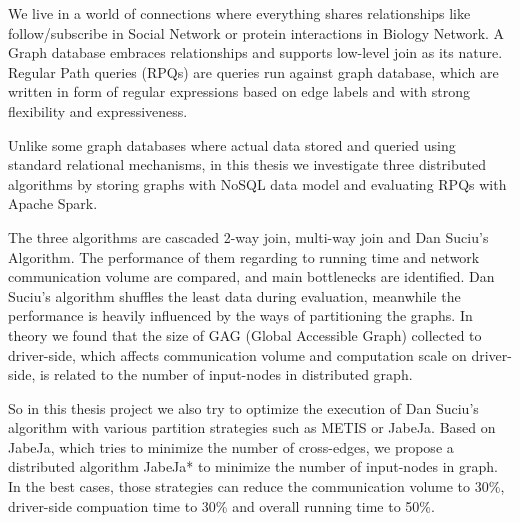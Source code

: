 We live in a world of connections where everything shares relationships like follow/subscribe in Social Network or protein interactions in Biology Network. A Graph database embraces relationships and supports low-level join as its nature. Regular Path queries (RPQs) are queries run against graph database, which are written in form of regular expressions based on edge labels and with strong flexibility and expressiveness.

Unlike some graph databases where actual data stored
and queried using standard relational mechanisms, in this thesis we investigate three distributed algorithms by storing graphs with NoSQL data model and evaluating RPQs with Apache Spark.

The three algorithms are cascaded 2-way join, multi-way join and Dan Suciu's Algorithm. The performance of them regarding to running time and network communication volume are compared, and main bottlenecks are identified. Dan Suciu's algorithm shuffles the least data during evaluation, meanwhile the performance is heavily influenced by the ways of partitioning the graphs. In theory we found that the size of GAG (Global Accessible Graph) collected to driver-side, which affects communication volume and computation scale on driver-side, is related to the number of input-nodes in distributed graph. 

So in this thesis project we also try to optimize the execution of Dan Suciu's algorithm with various partition strategies such as METIS or JabeJa. Based on JabeJa, which tries to minimize the number of cross-edges, we propose a distributed algorithm JabeJa* to minimize the number of input-nodes in graph. In the best cases, those strategies can reduce the communication volume to 30\%, driver-side compuation time to 30\% and overall running time to 50\%.

